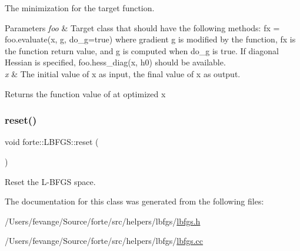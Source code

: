 The minimization for the target function. 


\begin{DoxyParams}{Parameters}
{\em foo} & Target class that should have the following methods\+: fx = foo.\+evaluate(x, g, do\+\_\+g=true) where gradient g is modified by the function, fx is the function return value, and g is computed when do\+\_\+g is true. If diagonal Hessian is specified, foo.\+hess\+\_\+diag(x, h0) should be available. \\
\hline
{\em x} & The initial value of x as input, the final value of x as output.\\
\hline
\end{DoxyParams}
\begin{DoxyReturn}{Returns}
the function value of at optimized x 
\end{DoxyReturn}
\mbox{\label{classforte_1_1_l_b_f_g_s_ae1925cb32a7963640d6f0b07d4a4e8c0}} 
\subsubsection{\texorpdfstring{reset()}{reset()}}
{\footnotesize\ttfamily void forte\+::\+L\+B\+F\+G\+S\+::reset (\begin{DoxyParamCaption}{ }\end{DoxyParamCaption})}



Reset the L-\/\+B\+F\+GS space. 



The documentation for this class was generated from the following files\+:\begin{DoxyCompactItemize}
\item 
/\+Users/fevange/\+Source/forte/src/helpers/lbfgs/\mbox{\hyperlink{lbfgs_8h}{lbfgs.\+h}}\item 
/\+Users/fevange/\+Source/forte/src/helpers/lbfgs/\mbox{\hyperlink{lbfgs_8cc}{lbfgs.\+cc}}\end{DoxyCompactItemize}
